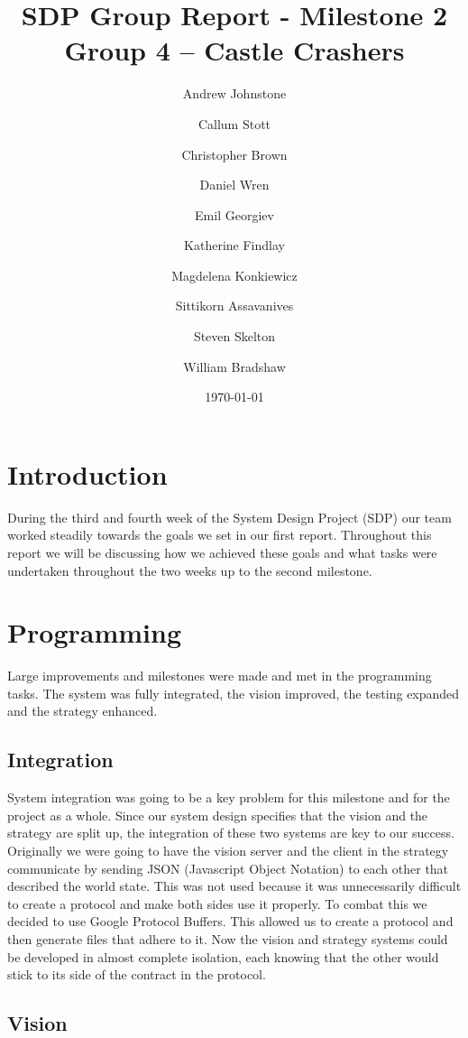 \documentclass[12pt, a4paper, titlepage]{article}
\title{\small{SDP Group Report - Milestone 2} \\ \huge Group 4 -- Castle Crashers}
\author{Andrew Johnstone \and Callum Stott \and Christopher Brown \and Daniel Wren \and Emil Georgiev \and Katherine Findlay \and Magdelena Konkiewicz \and Sittikorn Assavanives \and Steven Skelton \and William Bradshaw}
\date{\today}
\begin{document}
\maketitle

\section{Introduction}

During the third and fourth week of the System Design Project (SDP) our team
worked steadily towards the goals we set in our first report. Throughout this
report we will be discussing how we achieved these goals and what tasks were
undertaken throughout the two weeks up to the second milestone.

\section{Programming}

Large improvements and milestones were made and met in the programming tasks.
The system was fully integrated, the vision improved, the testing expanded and
the strategy enhanced.

\subsection{Integration}

System integration was going to be a key problem for this milestone and for
the project as a whole. Since our system design specifies that the vision
and the strategy are split up, the integration of these two systems are
key to our success. Originally we were going to have the vision server and
the client in the strategy communicate by sending JSON (Javascript Object
Notation) to each other that described the world state. This was not used
because it was unnecessarily difficult to create a protocol and make both
sides use it properly. To combat this we decided to use Google Protocol
Buffers\cite{protobuf}. This allowed us to create a protocol and then generate
files that adhere to it. Now the vision and strategy systems could be developed
in almost complete isolation, each knowing that the other would stick to its
side of the contract in the protocol.

\subsection{Vision}
\end{document}
